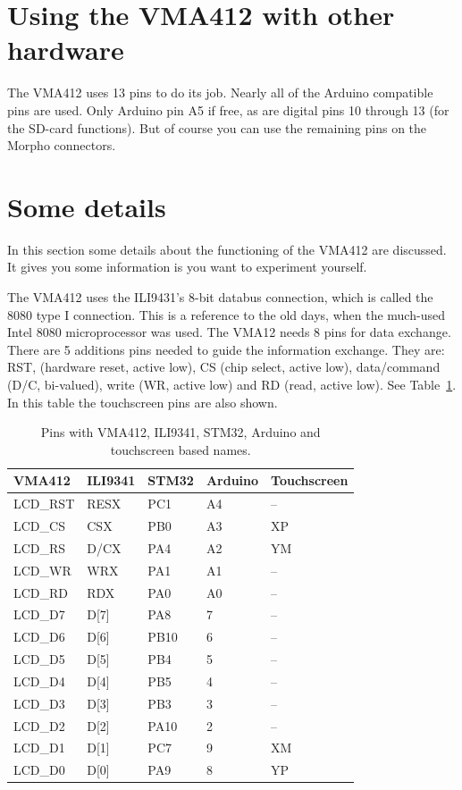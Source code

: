 \documentclass[12pt]{article}
\begin{document}
\section{Using the VMA412 with other hardware}
The VMA412 uses 13 pins to do its job. Nearly all of the Arduino compatible pins are used. Only Arduino pin A5 if free, as are digital pins 10 through 13 (for the SD-card functions). But of course you can use the remaining pins on the Morpho connectors.


\section{Some details}
In this section some details about the functioning of the VMA412 are discussed. It gives you some information is you want to experiment yourself.

The VMA412 uses the ILI9431's 8-bit databus connection, which is called the 8080 type I connection. This is a reference to the old days, when the much-used Intel 8080 microprocessor was used. The VMA12 needs 8 pins for data exchange. There are 5 additions pins needed to guide the information exchange. They are: RST, (hardware reset, active low), CS (chip select, active low), data/command (D/C, bi-valued), write (WR, active low) and RD (read, active low). See Table~\ref{tab:1}. In this table the touchscreen pins are also shown.


\begin{table}[!ht]
\centering
\caption{Pins with VMA412, ILI9341, STM32, Arduino and touchscreen based names.}
\label{tab:1}
\begin{tabular}{p{2.5cm}p{2.5cm}p{2.5cm}p{2.5cm}p{2.5cm}}
\toprule
VMA412 & ILI9341 & STM32 & Arduino & Touchscreen \\
\midrule
LCD\_RST & RESX & PC1    & A4 & -- \\
LCD\_CS  & CSX  & PB0    & A3 & XP \\
LCD\_RS  & D/CX & PA4    & A2 & YM \\
LCD\_WR  & WRX  & PA1    & A1 & -- \\
LCD\_RD  & RDX  & PA0    & A0 & -- \\[.8ex]
LCD\_D7  & D[7] & PA8    & 7  & -- \\
LCD\_D6  & D[6] & PB10   & 6  & -- \\
LCD\_D5  & D[5] & PB4    & 5  & -- \\
LCD\_D4  & D[4] & PB5    & 4  & -- \\
LCD\_D3  & D[3] & PB3    & 3  & -- \\
LCD\_D2  & D[2] & PA10   & 2  & -- \\
LCD\_D1  & D[1] & PC7    & 9  & XM \\
LCD\_D0  & D[0] & PA9    & 8  & YP \\
\bottomrule
\end{tabular}
\end{table}
\end{document}
